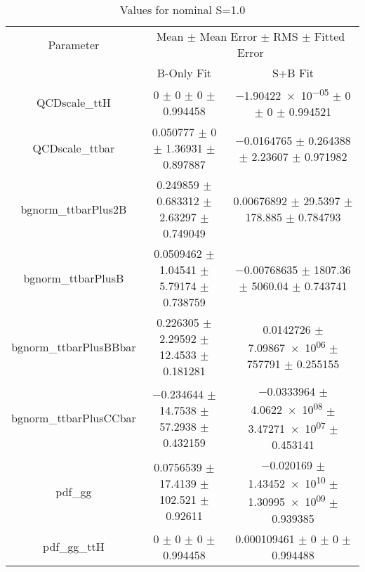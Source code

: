 \begin{table}
\centering
\caption{Values for nominal S=1.0}
\begin{tabular}{ccc}
\toprule
Parameter & \multicolumn{2}{c}{Mean $\pm$ Mean Error $\pm$ RMS $\pm$ Fitted Error}\\
 & B-Only Fit & S+B Fit\\
\midrule
QCDscale\_ttH & \num{0} $\pm$ \num{0} $\pm$ \num{0} $\pm$ \num{0.994458} & \num{-1.90422e-05} $\pm$ \num{0} $\pm$ \num{0} $\pm$ \num{0.994521}\\
QCDscale\_ttbar & \num{0.050777} $\pm$ \num{0} $\pm$ \num{1.36931} $\pm$ \num{0.897887} & \num{-0.0164765} $\pm$ \num{0.264388} $\pm$ \num{2.23607} $\pm$ \num{0.971982}\\
bgnorm\_ttbarPlus2B & \num{0.249859} $\pm$ \num{0.683312} $\pm$ \num{2.63297} $\pm$ \num{0.749049} & \num{0.00676892} $\pm$ \num{29.5397} $\pm$ \num{178.885} $\pm$ \num{0.784793}\\
bgnorm\_ttbarPlusB & \num{0.0509462} $\pm$ \num{1.04541} $\pm$ \num{5.79174} $\pm$ \num{0.738759} & \num{-0.00768635} $\pm$ \num{1807.36} $\pm$ \num{5060.04} $\pm$ \num{0.743741}\\
bgnorm\_ttbarPlusBBbar & \num{0.226305} $\pm$ \num{2.29592} $\pm$ \num{12.4533} $\pm$ \num{0.181281} & \num{0.0142726} $\pm$ \num{7.09867e+06} $\pm$ \num{757791} $\pm$ \num{0.255155}\\
bgnorm\_ttbarPlusCCbar & \num{-0.234644} $\pm$ \num{14.7538} $\pm$ \num{57.2938} $\pm$ \num{0.432159} & \num{-0.0333964} $\pm$ \num{4.0622e+08} $\pm$ \num{3.47271e+07} $\pm$ \num{0.453141}\\
pdf\_gg & \num{0.0756539} $\pm$ \num{17.4139} $\pm$ \num{102.521} $\pm$ \num{0.92611} & \num{-0.020169} $\pm$ \num{1.43452e+10} $\pm$ \num{1.30995e+09} $\pm$ \num{0.939385}\\
pdf\_gg\_ttH & \num{0} $\pm$ \num{0} $\pm$ \num{0} $\pm$ \num{0.994458} & \num{0.000109461} $\pm$ \num{0} $\pm$ \num{0} $\pm$ \num{0.994488}\\
\bottomrule
\end{tabular}
\end{table}